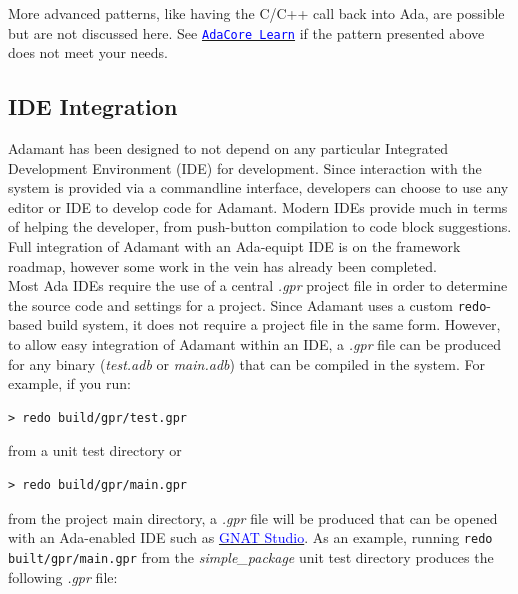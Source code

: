 More advanced patterns, like having the C/C++ call back into Ada, are possible but are not discussed here. See \href{https://learn.adacore.com/courses/intro-to-embedded-sys-prog/chapters/multi_language_development.html}{\texttt{\textcolor{blue}{AdaCore Learn}}} if the pattern presented above does not meet your needs.

\subsection{IDE Integration} \label{IDE Integration}

Adamant has been designed to not depend on any particular Integrated Development Environment (IDE) for development. Since interaction with the system is provided via a commandline interface, developers can choose to use any editor or IDE to develop code for Adamant. Modern IDEs provide much in terms of helping the developer, from push-button compilation to code block suggestions. Full integration of Adamant with an Ada-equipt IDE is on the framework roadmap, however some work in the vein has already been completed. \\

Most Ada IDEs require the use of a central \textit{.gpr} project file in order to determine the source code and settings for a project. Since Adamant uses a custom \texttt{redo}-based build system, it does not require a project file in the same form. However, to allow easy integration of Adamant within an IDE, a \textit{.gpr} file can be produced for any binary (\textit{test.adb} or \textit{main.adb}) that can be compiled in the system. For example, if you run:

\vspace{5mm} %
\begin{verbatim}
> redo build/gpr/test.gpr
\end{verbatim}
\vspace{5mm} %

from a unit test directory or 

\vspace{5mm} %
\begin{verbatim}
> redo build/gpr/main.gpr
\end{verbatim}
\vspace{5mm} %

from the project main directory, a \textit{.gpr} file will be produced that can be opened with an Ada-enabled IDE such as \href{https://docs.adacore.com/live/wave/gps/html/gps_ug/index.html}{\textcolor{blue}{GNAT Studio}}. As an example, running \texttt{redo built/gpr/main.gpr} from the \textit{simple\_package} unit test directory produces the following \textit{.gpr} file: \\

